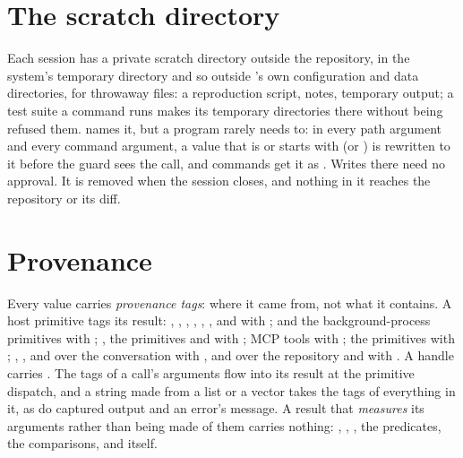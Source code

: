 \section{The scratch directory}

Each session has a private scratch directory outside the repository, in
the system's temporary directory and so outside \nodwyn's own configuration
and data directories, for throwaway files: a reproduction script, notes,
temporary output; a test suite a command runs makes its temporary
directories there without being refused them.  names it, but a program rarely needs to: in every
path argument and every command argument, a value that is 
or starts with  (or ) is rewritten to
it before the guard sees the call, and commands get it as .
Writes there need no approval. It is removed when the session closes, and
nothing in it reaches the repository or its diff.


\section{Provenance}\label{sch:provenance}

Every value carries \emph{provenance tags}: where it came from, not what it
contains. A host primitive tags its result: , ,
, , , ,
 and  with ;
 and the background-process primitives with
; , the 
primitives and  with
; MCP tools with ; the
 primitives with ;
, ,  and
 over the conversation with , and
 over the repository and  with
. A handle carries . The tags of a
call's arguments flow into its result at the primitive dispatch, and a
string made from a list or a vector takes the tags of everything in it, as
do captured output and an error's message. A result that \emph{measures} its arguments rather than being made
of them carries nothing: , ,
, the predicates, the comparisons,  and
 itself.

